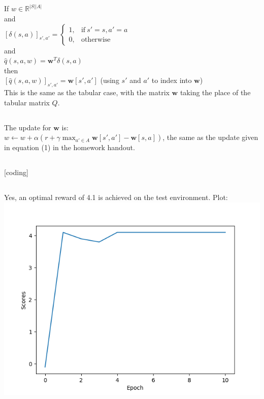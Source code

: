 \documentclass[10pt,a4paper]{article}
\begin{document}
  \subsection{}
  If $w \in \mathbb{R}^{|S||A|}$ \\
  and \\
  $[\delta(s,a)]_{s',a'}=\begin{cases}
  1, & \text{if}\ s'=s, a'=a \\
  0, & \text{otherwise}
  \end{cases}$ \\
  and \\
  $\hat{q}(s,a,w)=\boldsymbol{w}^T\delta(s,a)$ \\
  then \\
  $[\hat{q}(s,a,w)]_{s',a'}=\boldsymbol{w}[s',a']$ (using $s'$ and $a'$ to index into $\boldsymbol{w}$) \\
  This is the same as the tabular case, with the matrix $\boldsymbol{w}$ taking the place of the tabular matrix $Q$.
  
  \subsection{}
  The update for $\boldsymbol{w}$ is: \\
  $w \leftarrow w + \alpha(r + \gamma\max_{a'\in{A}}\boldsymbol{w}[s',a']-\boldsymbol{w}[s,a])$, the same as the update given in equation (1) in the homework handout.
  
  \subsection{}
  [coding]
  
  \subsection{}
  Yes, an optimal reward of 4.1 is achieved on the test environment. Plot: \\
  \includegraphics[scale=0.5]{scores_q2_linear.png}
  
\end{document}
